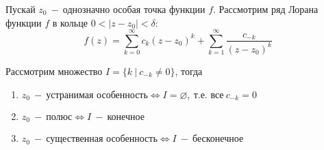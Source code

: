 Пускай $z_0~-~$однозначно особая точка функции $f$.
Рассмотрим ряд Лорана функции $f$ в кольце $0<|z-z_0|<\delta$: 
$$f(z)=\sum\limits_{k=0}^{\infty}c_k(z-z_0)^k+\sum\limits_{k=1}^\infty \dfrac{c_{-k}}{(z-z_0)^k}$$

Рассмотрим множество $I=\{k\ |\ c_{-k}\ne 0\}$,  тогда
\begin{enumerate}
    \item $z_0~-~\text{устранимая особенность}\iff I=\varnothing,\ \text{т.е. все}\ c_{-k}=0$
    \item $z_0~-~\text{полюс}\iff I~-~ \text{конечное}$
    \item $z_0~-~\text{существенная особенность}\iff I ~-~\text{бесконечное}$
\end{enumerate}
